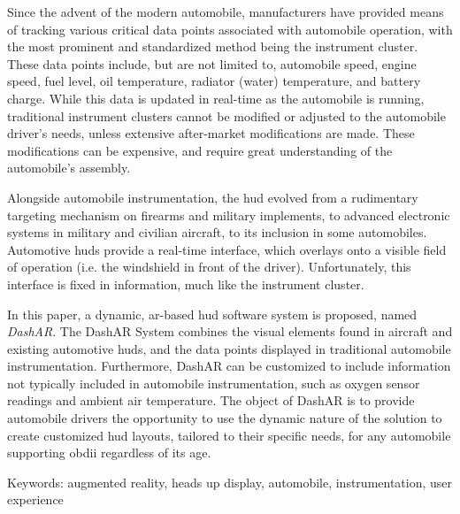 
\par Since the advent of the modern automobile, manufacturers have provided means of tracking various critical data points associated with automobile operation, with the most prominent and standardized method being the instrument cluster. These data points include, but are not limited to, automobile speed, engine speed, fuel level, oil temperature, radiator (water) temperature, and battery charge. While this data is updated in real-time as the automobile is running, traditional instrument clusters cannot be modified or adjusted to the automobile driver's needs, unless extensive after-market modifications are made. These modifications can be expensive, and require great understanding of the automobile's assembly.

\par Alongside automobile instrumentation, the \gls{hud} evolved from a rudimentary targeting mechanism on firearms and military implements, to advanced electronic systems in military and civilian aircraft, to its inclusion in some automobiles. Automotive \glspl{hud} provide a real-time interface, which overlays onto a visible field of operation (i.e. the windshield in front of the driver). Unfortunately, this interface is fixed in information, much like the instrument cluster.

\par In this paper, a dynamic, \gls{ar}-based \gls{hud} software system is proposed, named \textit{DashAR}. The DashAR System combines the visual elements found in aircraft and existing automotive \glspl{hud}, and the data points displayed in traditional automobile instrumentation. Furthermore, DashAR can be customized to include information not typically included in automobile instrumentation, such as oxygen sensor readings and ambient air temperature. The object of DashAR is to provide automobile drivers the opportunity to use the dynamic nature of the solution to create customized \gls{hud} layouts, tailored to their specific needs, for any automobile supporting \gls{obdii} regardless of its age.

\vspace{\baselineskip}

\noindent Keywords: augmented reality, heads up display, automobile, instrumentation, user experience